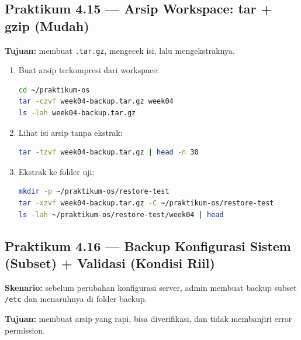 \subsection*{Praktikum 4.15 --- Arsip Workspace: tar + gzip (Mudah)}
\textbf{Tujuan:} membuat \texttt{.tar.gz}, mengecek isi, lalu mengekstraknya.

\begin{enumerate}
    \item Buat arsip terkompresi dari workspace:
\begin{lstlisting}[language=bash, caption={Membuat tar.gz}]
cd ~/praktikum-os
tar -czvf week04-backup.tar.gz week04
ls -lah week04-backup.tar.gz
\end{lstlisting}

    \item Lihat isi arsip tanpa ekstrak:
\begin{lstlisting}[language=bash, caption={Melihat isi tar.gz}]
tar -tzvf week04-backup.tar.gz | head -n 30
\end{lstlisting}

    \item Ekstrak ke folder uji:
\begin{lstlisting}[language=bash, caption={Mengekstrak tar.gz ke folder tertentu}]
mkdir -p ~/praktikum-os/restore-test
tar -xzvf week04-backup.tar.gz -C ~/praktikum-os/restore-test
ls -lah ~/praktikum-os/restore-test/week04 | head
\end{lstlisting}
\end{enumerate}

\subsection*{Praktikum 4.16 --- Backup Konfigurasi Sistem (Subset) + Validasi (Kondisi Riil)}
\textbf{Skenario:} sebelum perubahan konfigurasi server, admin membuat backup subset \texttt{/etc} dan menaruhnya di folder backup.

\textbf{Tujuan:} membuat arsip yang rapi, bisa diverifikasi, dan tidak membanjiri error permission.

